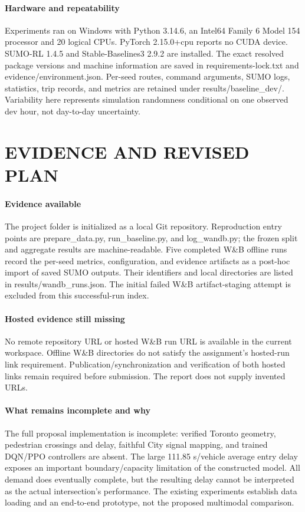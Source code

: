 \documentclass[conference]{IEEEtran}
\begin{document}
\paragraph{Hardware and repeatability} Experiments ran on Windows with Python 3.14.6, an Intel64 Family 6 Model 154 processor and 20 logical CPUs. PyTorch 2.15.0+cpu reports no CUDA device. SUMO-RL 1.4.5 and Stable-Baselines3 2.9.2 are installed. The exact resolved package versions and machine information are saved in requirements-lock.txt and evidence/environment.json. Per-seed routes, command arguments, SUMO logs, statistics, trip records, and metrics are retained under results/baseline\_dev/. Variability here represents simulation randomness conditional on one observed dev hour, not day-to-day uncertainty.

\section{EVIDENCE AND REVISED PLAN}
\paragraph{Evidence available} The project folder is initialized as a local Git repository. Reproduction entry points are prepare\_data.py, run\_baseline.py, and log\_wandb.py; the frozen split and aggregate results are machine-readable. Five completed W\&B offline runs record the per-seed metrics, configuration, and evidence artifacts as a post-hoc import of saved SUMO outputs. Their identifiers and local directories are listed in results/wandb\_runs.json. The initial failed W\&B artifact-staging attempt is excluded from this successful-run index.

\paragraph{Hosted evidence still missing} No remote repository URL or hosted W\&B run URL is available in the current workspace. Offline W\&B directories do not satisfy the assignment's hosted-run link requirement. Publication/synchronization and verification of both hosted links remain required before submission. The report does not supply invented URLs.

\paragraph{What remains incomplete and why} The full proposal implementation is incomplete: verified Toronto geometry, pedestrian crossings and delay, faithful City signal mapping, and trained DQN/PPO controllers are absent. The large 111.85 s/vehicle average entry delay exposes an important boundary/capacity limitation of the constructed model. All demand does eventually complete, but the resulting delay cannot be interpreted as the actual intersection's performance. The existing experiments establish data loading and an end-to-end prototype, not the proposed multimodal comparison.
\end{document}
